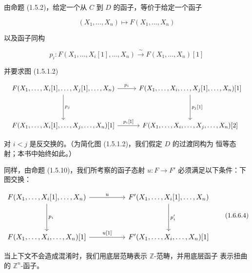 \clearpage
{}%
由命题 (1.5.2)，给定一个从 $C$ 到 $D$ 的函子，等价于给定一个函子

\begin{equation}
  (X_1,\ldots,X_n)\longmapsto F(X_1,\ldots,X_n)
  \tag{1.6.6.2}
\end{equation}

以及函子同构

\begin{equation}
  p_i\colon
  F(X_1,\ldots,X_i[1],\ldots,X_n)
  \xrightarrow{\ \sim\ }
  F(X_1,\ldots,X_n)[1]
  \tag{1.6.6.3}
\end{equation}

并要求图 (1.5.1.2)

\begin{equation*}
  \resizebox{\textwidth}{!}{%
    $\begin{tikzcd}[ampersand replacement=\&,column sep=2.8em,row sep=3.8em]
      F(X_1,\ldots,X_i[1],\ldots,X_j[1],\ldots,X_n)
        \arrow[r,"{p_i}"]
        \arrow[d,"{p_j}"]
        \& F(X_1,\ldots,X_i,\ldots,X_j[1],\ldots,X_n)[1]
          \arrow[d,"{p_j[1]}"] \\
      F(X_1,\ldots,X_i[1],\ldots,X_j,\ldots,X_n)[1]
        \arrow[r,"{p_i[1]}"]
        \& F(X_1,\ldots,X_i,\ldots,X_j,\ldots,X_n)[2]
    \end{tikzcd}$%
  }
\end{equation*}

对 $i<j$ 是反交换的。（为简化图 (1.5.1.2)，我们假定 $D$ 的过渡同构为
恒等态射；本书中始终如此。）

同样，由命题 (1.5.10)，我们所考察的函子态射
$u\colon F\to F'$ 必须满足以下条件：下图交换：

\begin{equation}
  \resizebox{0.92\textwidth}{!}{%
    $\begin{tikzcd}[ampersand replacement=\&,column sep=5.0em,row sep=3.8em]
      F(X_1,\ldots,X_i[1],\ldots,X_n)
        \arrow[r,"u"]
        \arrow[d,"{p_i}"]
        \& F'(X_1,\ldots,X_i[1],\ldots,X_n)
          \arrow[d,"{p'_i}"] \\
      F(X_1,\ldots,X_i,\ldots,X_n)[1]
        \arrow[r,"{u[1]}"]
        \& F'(X_1,\ldots,X_i,\ldots,X_n)[1]
    \end{tikzcd}$%
  }
  \tag{1.6.6.4}
\end{equation}

当上下文不会造成混淆时，我们用底层范畴表示 $\mathbb Z$-范畴，并用底层函子
表示扭曲的 $\mathbb Z^n$-函子。
